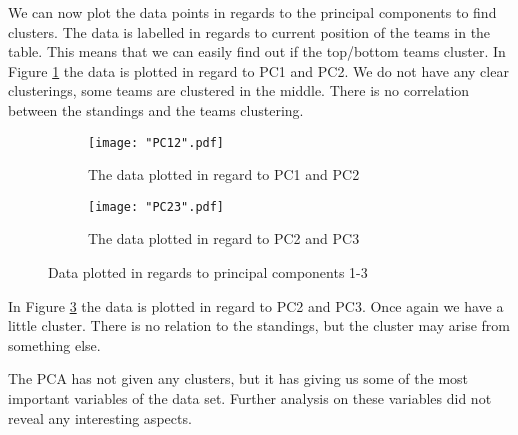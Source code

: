 \documentclass[Report.tex]{subfiles}
\begin{document}
We can now plot the data points in regards to the principal components to find clusters. The data is labelled in regards to current position of the teams in the table. This means that we can easily find out if the top/bottom teams cluster. In Figure \ref{fig:PC12} the data is plotted in regard to PC1 and PC2. We do not have any clear clusterings, some teams are clustered in the middle. There is no correlation between the standings and the teams clustering.

\begin{figure}
\center
\begin{subfigure}[b]{0.49\textwidth}
\texttt{[image: "PC12".pdf]}
\caption{The data plotted in regard to PC1 and PC2}
\label{fig:PC12}
\end{subfigure}
\begin{subfigure}[b]{0.49\textwidth}
\texttt{[image: "PC23".pdf]}
\caption{The data plotted in regard to PC2 and PC3}
\label{fig:PC23}
\end{subfigure}
\caption{Data plotted in regards to principal components 1-3}

\end{figure}
In Figure \ref{fig:PC23} the data is plotted in regard to PC2 and PC3. Once again we have a little cluster. There is no relation to the standings, but the cluster may arise from something else.

The PCA has not given any clusters, but it has giving us some of the most important variables of the data set. Further analysis on these variables did not reveal any interesting aspects. 
\end{document}
